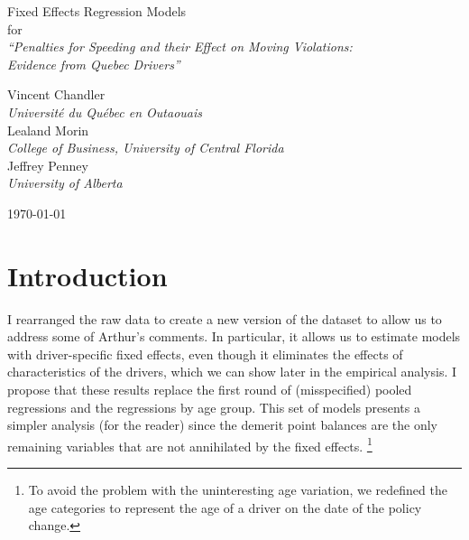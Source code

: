 \documentclass[12pt]{paper}
\begin{document}
\phantom{0}
\vspace{1.0in}


\begin{centering}

{\huge 
Fixed Effects Regression Models  \\
\bigskip
for \\
\bigskip
{\it ``Penalties for Speeding and their Effect on Moving Violations: \\
	Evidence from Quebec Drivers''} \\
}

\vspace{1.25in}


{\large 
Vincent Chandler \\
{\it Universit\'{e} du Qu\'{e}bec en Outaouais} \\
\medskip
Lealand Morin \\
{\it College of Business, University of Central Florida} \\
\medskip
Jeffrey Penney \\
{\it University of Alberta} \\
}

\vspace{1.25in}



\today

\end{centering}

\pagebreak

\section*{Introduction}

I rearranged the raw data to create a new version of the dataset to allow us to address some of Arthur's comments. 
In particular, it allows us to estimate models with driver-specific fixed effects, even though
it eliminates the effects of characteristics of the drivers, which we can show later in the empirical analysis. 
I propose that these results replace the first round of (misspecified) pooled regressions and the regressions 
by age group. 
This set of models presents a simpler analysis (for the reader) since the demerit point balances are the only remaining variables that are not annihilated by the fixed effects.%
\footnote{To avoid the problem with the uninteresting age variation, we redefined the age categories
to represent the age of a driver on the date of the policy change.} 
\end{document}
